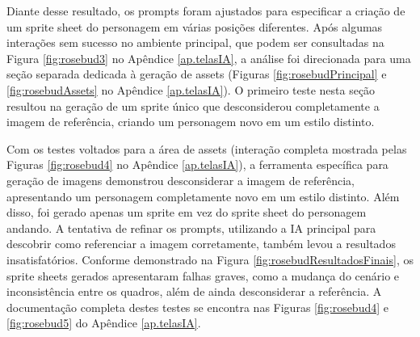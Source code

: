 Diante desse resultado, os prompts foram ajustados para especificar a criação de um sprite sheet do personagem em várias posições diferentes. Após algumas interações sem sucesso no ambiente principal, que podem ser consultadas na Figura \ref{fig:rosebud3} no Apêndice \ref{ap.telasIA}, a análise foi direcionada para uma seção separada dedicada à geração de assets (Figuras \ref{fig:rosebudPrincipal} e \ref{fig:rosebudAssets} no Apêndice \ref{ap.telasIA}). O primeiro teste nesta seção resultou na geração de um sprite único que desconsiderou completamente a imagem de referência, criando um personagem novo em um estilo distinto.

Com os testes voltados para a área de assets (interação completa mostrada pelas Figuras \ref{fig:rosebud4} no Apêndice \ref{ap.telasIA}), a ferramenta específica para geração de imagens demonstrou desconsiderar a imagem de referência, apresentando um personagem completamente novo em um estilo distinto. Além disso, foi gerado apenas um sprite em vez do sprite sheet do personagem andando. A tentativa de refinar os prompts, utilizando a IA principal para descobrir como referenciar a imagem corretamente, também levou a resultados insatisfatórios. Conforme demonstrado na Figura \ref{fig:rosebudResultadosFinais}, os sprite sheets gerados apresentaram falhas graves, como a mudança do cenário e inconsistência entre os quadros, além de ainda desconsiderar a referência. A documentação completa destes testes se encontra nas Figuras \ref{fig:rosebud4} e \ref{fig:rosebud5} do Apêndice \ref{ap.telasIA}.

